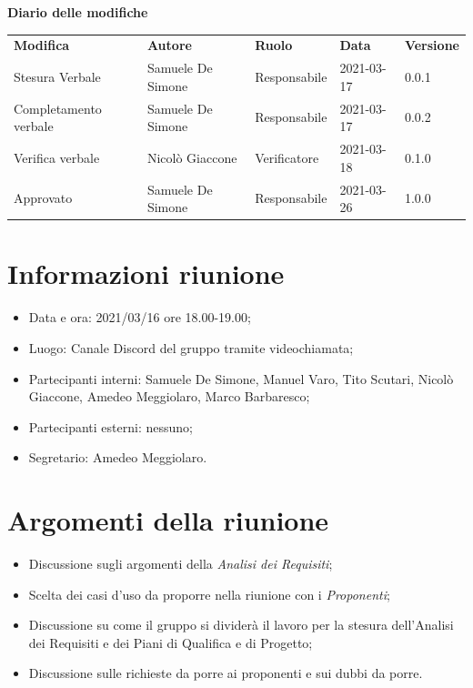 \documentclass[a4paper]{article}
\begin{document}
    \begin{center}
        \textbf{\Large Diario delle modifiche}\\
        \vspace{10px}
        \begin{table}[h!]
        \centering
        \renewcommand{\arraystretch}{1.8}
        \begin{tabular}{p{150px} p{90px} p{60px} p{60px} p{45px}}
            \rowcolor{logo!70} \textbf{Modifica} & \textbf{Autore} & \textbf{Ruolo} & \textbf{Data} & \textbf{Versione}\\
            Stesura Verbale & Samuele De Simone & Responsabile & 2021-03-17 & 0.0.1 \\    
            Completamento verbale & Samuele De Simone & Responsabile & 2021-03-17 & 0.0.2\\
            Verifica verbale & Nicolò Giaccone & Verificatore & 2021-03-18 & 0.1.0\\
            Approvato & Samuele De Simone & Responsabile & 2021-03-26 & 1.0.0\\
        \end{tabular}
    \end{table}
    \end{center}

    \newpage
    \tableofcontents
    \newpage
    \section{Informazioni riunione}
    \begin{itemize}
        \item Data e ora: 2021/03/16 ore 18.00-19.00;
        \item Luogo: Canale Discord del gruppo tramite videochiamata;
        \item Partecipanti interni: Samuele De Simone, Manuel Varo, Tito Scutari, Nicolò Giaccone, Amedeo Meggiolaro, Marco Barbaresco;
        \item Partecipanti esterni: nessuno;
        \item Segretario: Amedeo Meggiolaro.
    \end{itemize}
    \section{Argomenti della riunione}
    \begin{itemize}
        \item Discussione sugli argomenti della \textit{Analisi dei Requisiti};
        \item Scelta dei casi d'uso da proporre nella riunione con i \textit{Proponenti};
        \item Discussione su come il gruppo si dividerà il lavoro per la stesura dell'Analisi dei Requisiti e dei Piani di Qualifica e di Progetto;
        \item Discussione sulle richieste da porre ai proponenti e sui dubbi da porre.
    \end{itemize}
\end{document}
